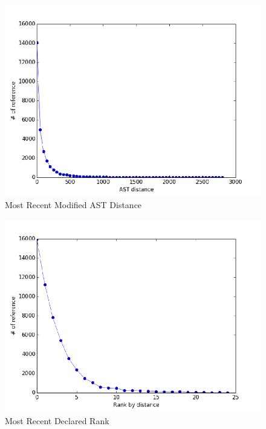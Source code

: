 \documentclass[prodmode,acmtecs]{acmsmall} %
\begin{document}
\begin{figure}
\centerline{\includegraphics[width=1\textwidth]{assign_ast_distance}}
\caption{Most Recent Modified AST Distance}
\label{fig:ast example}
\end{figure}

\begin{figure}
\centerline{\includegraphics[width=1.0\textwidth]{declare_rank_distance}}
\caption{Most Recent Declared Rank}
\label{fig:declare ast distance}
\end{figure}
                                                           
\end{document}
